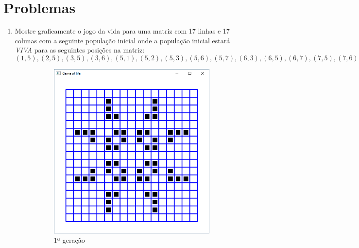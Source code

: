 \section*{Problemas}
\begin{enumerate}
\item
  Mostre graficamente o jogo da vida para uma matriz com 17 linhas e 17 colunas com a seguinte população inicial onde a população inicial estará \emph{VIVA} para as seguintes posições na matriz:
  $$
    (1,5), (2,5), (3,5), (3,6), (5,1), (5,2), (5,3), (5,6), (5,7), (6,3), (6,5), (6,7), (7,5), (7,6)
  $$
  \label{ex:cap02_ex2}

     \begin{figure}[!htp]
    \centering
    \begin{subfigure}[t]{0.3\textwidth}
        \centerline{\includegraphics[width=.9\textwidth]{img/cap2_ex9.png}}
        \caption{1ª geração}
        \label{fig:cap03_ex9a}
    \end{subfigure}
    ~
    \begin{subfigure}[t]{0.3\textwidth}

\end{subfigure}
\end{figure}
\end{enumerate}
